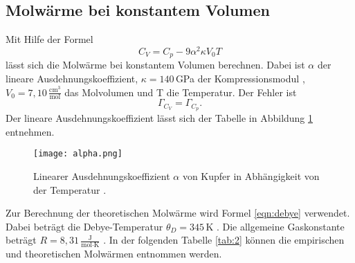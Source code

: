 

\subsection{Molwärme bei konstantem Volumen}
Mit Hilfe der Formel
\begin{equation}
  C_V = C_p - 9\alpha^2\kappa{V_0}T
\end{equation}
lässt sich die Molwärme bei konstantem Volumen berechnen.
Dabei ist $\alpha$ der lineare Ausdehnungskoeffizient, $\kappa = 140$\,GPa der Kompressionsmodul \cite{kappa}, $V_0 = 7,10 \,\frac{\text{cm}^3}{\text{mol}}$ das Molvolumen \cite{cu} und T die Temperatur.
Der Fehler ist
\begin{equation}
  \Gamma_{C_V} = \Gamma_{C_p}.
\end{equation}
Der lineare Ausdehnungskoeffizient lässt sich der Tabelle in Abbildung \ref{alpha} entnehmen.

\begin{figure}[H]
  \centering
  \texttt{[image: alpha.png]}
  \caption{Linearer Ausdehnungskoeffizient $\alpha$ von Kupfer in Abhängigkeit von der Temperatur \cite{skript}.}
  \label{alpha}
\end{figure}

Zur Berechnung der theoretischen Molwärme wird Formel \eqref{eqn:debye} verwendet.
Dabei beträgt die Debye-Temperatur $\theta_D = 345$\,K \cite{debye}.
Die allgemeine Gaskonstante beträgt $R = 8,31 \,\frac{\text{J}}{\text{mol}\cdot\text{K}}$ \cite[587]{dem}.
In der folgenden Tabelle \ref{tab:2} können die empirischen und theoretischen Molwärmen entnommen werden.

